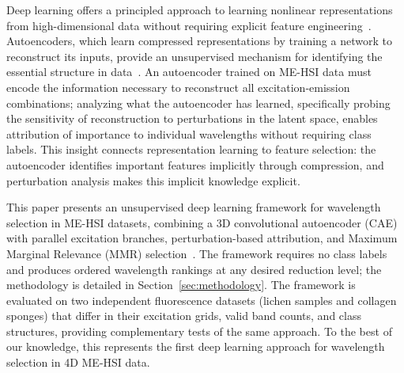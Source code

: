 Deep learning offers a principled approach to learning nonlinear representations from high-dimensional data without requiring explicit feature engineering~\cite{lecun2015deep}.
Autoencoders, which learn compressed representations by training a network to reconstruct its inputs, provide an unsupervised mechanism for identifying the essential structure in data~\cite{hinton2006reducing,bengio2013representation}.
An autoencoder trained on ME-HSI data must encode the information necessary to reconstruct all excitation-emission combinations; analyzing what the autoencoder has learned, specifically probing the sensitivity of reconstruction to perturbations in the latent space, enables attribution of importance to individual wavelengths without requiring class labels.
This insight connects representation learning to feature selection: the autoencoder identifies important features implicitly through compression, and perturbation analysis makes this implicit knowledge explicit.

This paper presents an unsupervised deep learning framework for wavelength selection in ME-HSI datasets, combining a 3D convolutional autoencoder (CAE) with parallel excitation branches, perturbation-based attribution, and Maximum Marginal Relevance (MMR) selection~\cite{carbonell1998use}.
The framework requires no class labels and produces ordered wavelength rankings at any desired reduction level; the methodology is detailed in Section~\ref{sec:methodology}.
The framework is evaluated on two independent fluorescence datasets (lichen samples and collagen sponges) that differ in their excitation grids, valid band counts, and class structures, providing complementary tests of the same approach.
To the best of our knowledge, this represents the first deep learning approach for wavelength selection in 4D ME-HSI data.